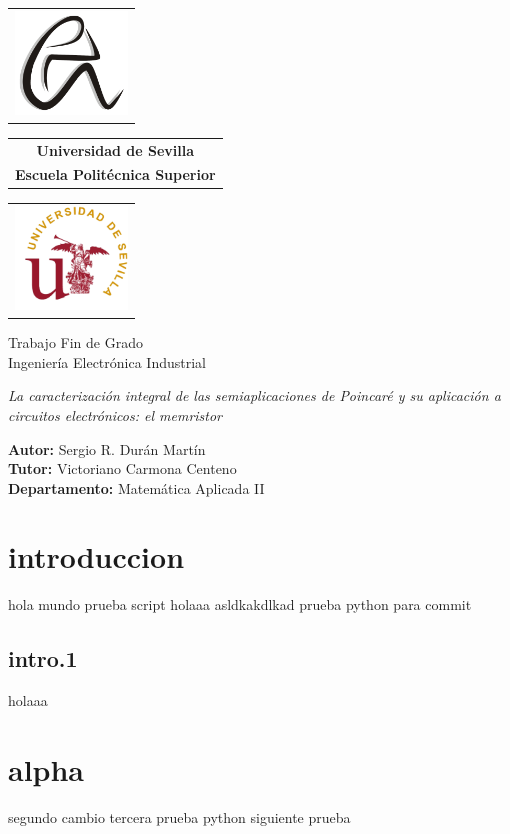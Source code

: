 \documentclass{article}
\begin{document}
	
	\begin{titlepage}
		\centering
		\hspace*{-1.5cm}\begin{tabular}{@{}l@{}}
			\includegraphics[width=3cm]{a.png} %
		\end{tabular}
		\hfill
		\begin{tabular}{c}
			\LARGE\textbf{Universidad de Sevilla} \\ [0.5cm] %
			\LARGE\textbf{Escuela Politécnica Superior} %
		\end{tabular}%
		\hfill
		\begin{tabular}{@{}r@{}}
			\includegraphics[width=3cm]{b.png} %
		\end{tabular}\hspace*{-1.5cm}
		
		\vspace{1.5cm}
		
		\begin{center}
			\Large\textmd{Trabajo Fin de Grado} \\ [0.5cm] %
			\Large\textmd{Ingeniería Electrónica Industrial}
		\end{center}
		
		\vspace{2cm}
		
		\begin{center}
			\LARGE\textsl{La caracterización integral de las semiaplicaciones de Poincaré y su aplicación a circuitos electrónicos: el memristor}
		\end{center}
		
		\vspace{6cm}
		
		\raggedright
		\large\textbf{Autor:} Sergio R. Durán Martín \\ [0.5cm]
		\large\textbf{Tutor:} Victoriano Carmona Centeno \\ [0.5cm]
		\large\textbf{Departamento:} Matemática Aplicada II
	\end{titlepage}
	
	\newpage
	\section{introduccion}
	hola mundo prueba script
	\newpage
	holaaa
	\newpage
	asldkakdlkad prueba python para commit
	\newpage
	\subsection{intro.1}
	holaaa
	\newpage
	\section{alpha}
	segundo cambio tercera prueba python siguiente prueba
\end{document}
